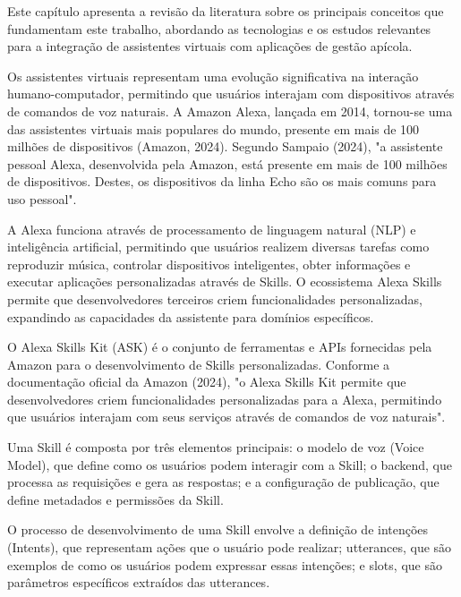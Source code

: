 \label{cap:revisao-literatura}

Este capítulo apresenta a revisão da literatura sobre os principais conceitos que fundamentam este trabalho, abordando as tecnologias e os estudos relevantes para a integração de assistentes virtuais com aplicações de gestão apícola.

\label{sec:alexa}

Os assistentes virtuais representam uma evolução significativa na interação humano-computador, permitindo que usuários interajam com dispositivos através de comandos de voz naturais. 
A Amazon Alexa, lançada em 2014, tornou-se uma das assistentes virtuais mais populares do mundo, presente em mais de 100 milhões de dispositivos (Amazon, 2024). 
Segundo Sampaio (2024), "a assistente pessoal Alexa, desenvolvida pela Amazon, está presente em mais de 100 milhões de dispositivos. Destes, os dispositivos da linha Echo são os mais comuns para uso pessoal".

A Alexa funciona através de processamento de linguagem natural (NLP) e inteligência artificial, permitindo que usuários realizem diversas tarefas como reproduzir música, controlar dispositivos inteligentes, 
obter informações e executar aplicações personalizadas através de Skills. O ecossistema Alexa Skills permite que desenvolvedores terceiros criem funcionalidades personalizadas, 
expandindo as capacidades da assistente para domínios específicos.


O Alexa Skills Kit (ASK) é o conjunto de ferramentas e APIs fornecidas pela Amazon para o desenvolvimento de Skills personalizadas. 
Conforme a documentação oficial da Amazon (2024), "o Alexa Skills Kit permite que desenvolvedores criem funcionalidades personalizadas para a Alexa, 
permitindo que usuários interajam com seus serviços através de comandos de voz naturais".

Uma Skill é composta por três elementos principais: o modelo de voz (Voice Model), que define como os usuários podem interagir com a Skill; 
o backend, que processa as requisições e gera as respostas; e a configuração de publicação, que define metadados e permissões da Skill.

O processo de desenvolvimento de uma Skill envolve a definição de intenções (Intents), que representam ações que o usuário pode realizar; 
utterances, que são exemplos de como os usuários podem expressar essas intenções; e slots, que são parâmetros específicos extraídos das utterances.


